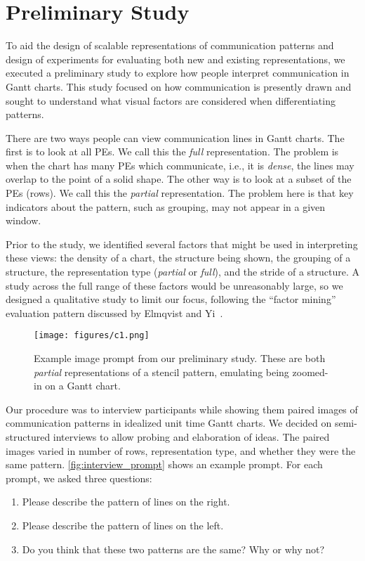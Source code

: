 \section{Preliminary Study}
\label{sec:prelim}

To aid the design of scalable representations of communication patterns and design of experiments for evaluating both new and existing representations, we executed a preliminary study to explore how people interpret communication in Gantt charts. This study focused on how communication is presently drawn and sought to understand what visual factors are considered when differentiating patterns. 

There are two ways people can view communication lines in Gantt charts. The first is to look at all PEs. We call this the {\em full} representation. The problem is when the chart has many PEs which communicate, i.e., it is {\em dense}, the lines may overlap to the point of a solid shape. The other way is to look at a subset of the PEs (rows). We call this the {\em partial} representation. The problem here is that key indicators about the pattern, such as grouping, may not appear in a given window.

Prior to the study, we identified several factors that might be used in interpreting these views: the density of a chart, the structure being shown, the grouping of a structure, the representation type ({\em  partial} or {\em full}), and the stride of a structure. A study across the full range of these factors would be unreasonably large, so we designed a qualitative study to limit our focus, following the ``factor mining'' evaluation pattern discussed by Elmqvist and Yi~\cite{elmqvist2015patterns}.

\begin{figure}
    \centering
    \texttt{[image: figures/c1.png]}
    \caption{Example image prompt from our preliminary study. These are both {\em partial} representations of a stencil pattern, emulating being zoomed-in on a Gantt chart.}
    \label{fig:interview_prompt}
\end{figure}

Our procedure was to interview participants while showing them paired images of communication patterns in idealized unit time Gantt charts. We decided on semi-structured interviews to allow probing and elaboration of ideas. The paired images varied in number of rows, representation type, and whether they were the same pattern. \autoref{fig:interview_prompt} shows an example prompt. For each prompt, we asked three questions:
\vspace{0em}
\begin{enumerate}
    \itemsep=0em
    \item Please describe the pattern of lines on the right.
    \item Please describe the pattern of lines on the left.
    \item Do you think that these two patterns are the same? Why or why not?
\end{enumerate}

